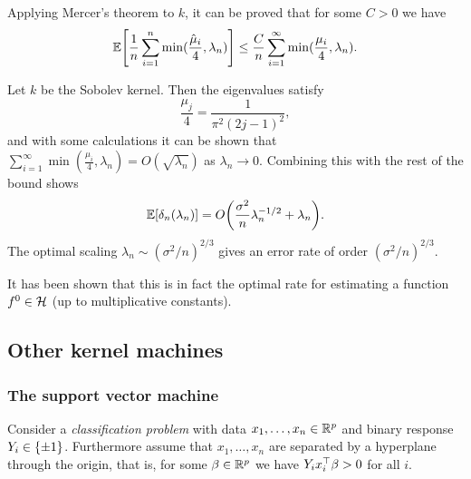 Applying Mercer's theorem to $k$, it can be proved that for some $C> 0$ we have
\[
\mathbb E\qty[\frac1n \sum_{i=1}^n \min(\frac{\hat \mu_i}{4}, \lambda_n)] \leq \frac Cn \sum_{i=1}^\infty \min(\frac{\mu_i}{4}, \lambda_n).
\]

\begin{example}
	Let $k$ be the Sobolev kernel. Then the eigenvalues satisfy 
	\[
	\frac{\mu_j}{4} = \frac{1}{\pi^2(2j - 1)^2}, 
	\]
	and with some calculations it can be shown that $\sum_{i=1}^\infty \min(\frac{\mu_i}{4}, \lambda_n) = O(\sqrt{\lambda_n})$ as $\lambda_n \to 0$. Combining this with the rest of the bound shows
	\[
	\mathbb E[\delta_n(\lambda_n)] = O\qty(\frac{\sigma^2}{n} \lambda_n^{-1/2} + \lambda_n). 
	\]
	The optimal scaling $\lambda_n \sim (\sigma^2/n)^{2/3}$ gives an error rate of order $(\sigma^2/n)^{2/3}$. 
	
	It has been shown that this is in fact the optimal rate for estimating a function $f^0 \in \mathcal H$ (up to multiplicative constants). 
\end{example}

\subsection{Other kernel machines}

\subsubsection{The support vector machine}
Consider a \emph{classification problem} with data $x_1, \dotsc, x_n \in \mathbb R^p$ and binary response $Y_i \in \qty{\pm 1}$. Furthermore assume that $x_1, \dotsc, x_n$ are separated by a hyperplane through the origin, that is, for some  $\beta \in \mathbb R^p$ we have $Y_i x_i^\top \beta > 0$ for all $i$. 

